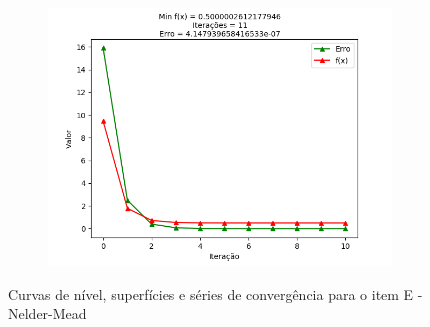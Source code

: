 \documentclass[a4paper, 12pt]{article}
\begin{document}
\begin{figure}[H]
\begin{subfigure}{0.3\textwidth}
  \centering
  \includegraphics[width=\linewidth]{1/E/NelderMead/convergencia.png}
\end{subfigure}
\caption{Curvas de nível, superfícies e séries de convergência para o item E - Nelder-Mead}
\label{fig:x-1x1}
\end{figure}
\end{document}
